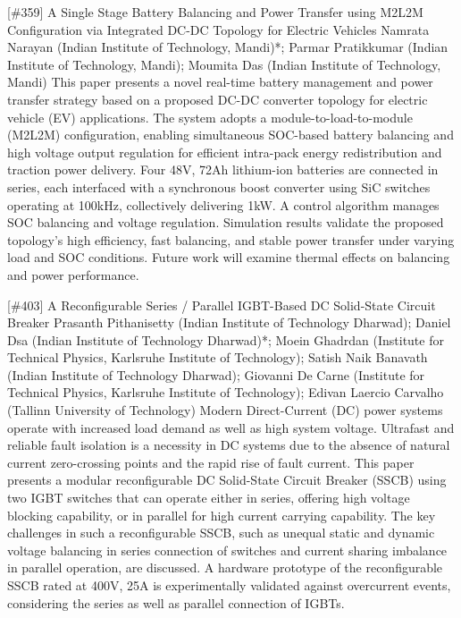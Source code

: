 {} \begin{abstract_online} {[\#359] A Single Stage Battery Balancing and Power Transfer using M2L2M Configuration via Integrated DC-DC Topology for Electric Vehicles} {} {Namrata Narayan (Indian Institute of Technology, Mandi)*; Parmar  Pratikkumar (Indian Institute of Technology, Mandi); Moumita Das (Indian Institute of Technology, Mandi)} {} This paper presents a novel real-time battery management and power transfer strategy based on a proposed DC-DC converter topology for electric vehicle (EV) applications. The system adopts a module-to-load-to-module (M2L2M) configuration, enabling simultaneous SOC-based battery balancing and high voltage output regulation for efficient intra-pack energy redistribution and traction power delivery. Four 48V, 72Ah lithium-ion batteries are connected in series, each interfaced with a synchronous boost converter using SiC switches operating at 100kHz, collectively delivering 1kW. A control algorithm manages SOC balancing and voltage regulation. Simulation results validate the proposed topology's high efficiency, fast balancing, and stable power transfer under varying load and SOC conditions. Future work will examine thermal effects on balancing and power performance. \end{abstract_online} 
{} \begin{abstract_online} {[\#403] A Reconfigurable Series / Parallel IGBT-Based DC Solid-State Circuit Breaker} {} {Prasanth Pithanisetty (Indian Institute of Technology Dharwad); Daniel Dsa (Indian Institute of Technology Dharwad)*; Moein Ghadrdan (Institute for Technical Physics, Karlsruhe Institute of Technology); Satish Naik Banavath (Indian Institute of Technology Dharwad); Giovanni De Carne (Institute for Technical Physics, Karlsruhe Institute of Technology); Edivan Laercio Carvalho (Tallinn University of Technology)} {} Modern Direct-Current (DC) power systems operate with increased load demand as well as high system voltage. Ultrafast and reliable fault isolation is a necessity in DC systems due to the absence of natural current zero-crossing points and the rapid rise of fault current. This paper presents a modular reconfigurable DC Solid-State Circuit Breaker (SSCB) using two IGBT switches that can operate either in series, offering high voltage blocking capability, or in parallel for high current carrying capability. The key challenges in such a reconfigurable SSCB, such as unequal static and dynamic voltage balancing in series connection of switches and current sharing imbalance in parallel operation, are discussed. A hardware prototype of the reconfigurable SSCB rated at 400V, 25A is experimentally validated against overcurrent events, considering the series as well as parallel connection of IGBTs. \end{abstract_online} 
